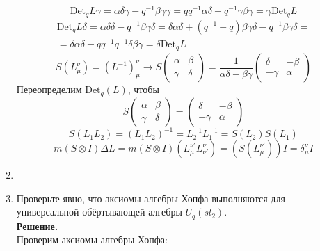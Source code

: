 \documentclass[12pt]{article}
\theoremstyle{definition}
\begin{document}
\begin{enumerate}
\begin{equation}
        \text{Det}_qL\gamma=\alpha\delta\gamma-q^{-1}\beta\gamma\gamma=qq^{-1}\alpha\delta-q^{-1}\gamma\beta\gamma=\gamma\text{Det}_qL
    \end{equation}
    \begin{multline}
        \text{Det}_qL\delta=\alpha\delta\delta-q^{-1}\beta\gamma\delta=\delta\alpha\delta+(q^{-1}-q)\beta\gamma\delta-q^{-1}\beta\gamma\delta=\\=\delta\alpha\delta-qq^{-1}q^{-1}\delta\beta\gamma=\delta\text{Det}_qL
    \end{multline}
    \begin{equation}
        S(L_\mu^\nu)=(L^{-1})_\mu^\nu\rightarrow S\begin{pmatrix}
            \alpha & \beta\\
            \gamma & \delta
        \end{pmatrix}=\frac{1}{\alpha\delta-\beta\gamma}\begin{pmatrix}
            \delta & -\beta\\
            -\gamma & \alpha
        \end{pmatrix}
    \end{equation}
    Переопределим $\text{Det}_q(L)$, чтобы
    \begin{equation}
        S\begin{pmatrix}
            \alpha & \beta\\
            \gamma & \delta
        \end{pmatrix}=\begin{pmatrix}
            \delta & -\beta\\
            -\gamma & \alpha
        \end{pmatrix}
    \end{equation}
    \begin{equation}
        S(L_1L_2)=(L_1L_2)^{-1}=L^{-1}_2L^{-1}_1=S(L_2)S(L_1)
    \end{equation}
    \begin{equation}
        m(S\otimes I)\Delta L=m(S\otimes I)(L_\mu^{\nu'}L_{\nu'}^\nu)=(S(L_\mu^{\nu'}))I=\delta_\mu^\nu I
    \end{equation}
    \item
    \item Проверьте явно, что аксиомы алгебры Хопфа выполняются для универсальной обёртывающей алгебры $U_q(sl_2)$.\\
    \textbf{Решение.}\\
    Проверим аксиомы алгебры Хопфа:
    \begin{enumerate}

\end{enumerate}
\end{enumerate}
\end{document}
